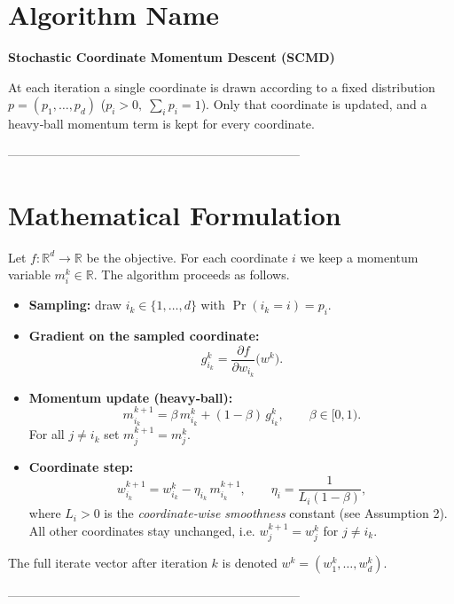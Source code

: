 \documentclass{article}
\newcommand{\R}{\mathbb{R}}
\begin{document}
\section*{Algorithm Name}
\textbf{Stochastic Coordinate Momentum Descent (SCMD)}  

At each iteration a single coordinate is drawn according to a fixed
distribution  \(p=(p_{1},\dots ,p_{d})\)  (\(p_{i}>0,\;\sum_{i}p_{i}=1\)).
Only that coordinate is updated, and a heavy‑ball momentum term is kept
for every coordinate.

-----------------------------------------------------------------------

\section*{Mathematical Formulation}
Let \(f:\R^{d}\rightarrow\R\) be the objective.  
For each coordinate \(i\) we keep a momentum variable
\(m_{i}^{k}\in\R\).  The algorithm proceeds as follows.

\begin{itemize}
  \item \textbf{Sampling:}  draw \(i_{k}\in\{1,\dots ,d\}\) with
        \(\Pr(i_{k}=i)=p_{i}\).
  \item \textbf{Gradient on the sampled coordinate:}
        \[
        g_{i_{k}}^{k}= \frac{\partial f}{\partial w_{i_{k}}}\bigl(w^{k}\bigr).
        \]
  \item \textbf{Momentum update (heavy‑ball):}
        \[
        m_{i_{k}}^{k+1}= \beta\, m_{i_{k}}^{k}+(1-\beta)\, g_{i_{k}}^{k},
        \qquad \beta\in[0,1).
        \]
        For all \(j\neq i_{k}\) set \(m_{j}^{k+1}=m_{j}^{k}\).
  \item \textbf{Coordinate step:}
        \[
        w_{i_{k}}^{k+1}= w_{i_{k}}^{k}-\eta_{i_{k}}\, m_{i_{k}}^{k+1},
        \qquad 
        \eta_{i}= \frac{1}{L_{i}(1-\beta)} ,
        \]
        where \(L_{i}>0\) is the \emph{coordinate‑wise smoothness}
        constant (see Assumption 2).  All other coordinates stay unchanged,
        i.e. \(w_{j}^{k+1}=w_{j}^{k}\) for \(j\neq i_{k}\).
\end{itemize}

The full iterate vector after iteration \(k\) is denoted
\(w^{k}=(w_{1}^{k},\dots ,w_{d}^{k})\).

-----------------------------------------------------------------------
\end{document}
